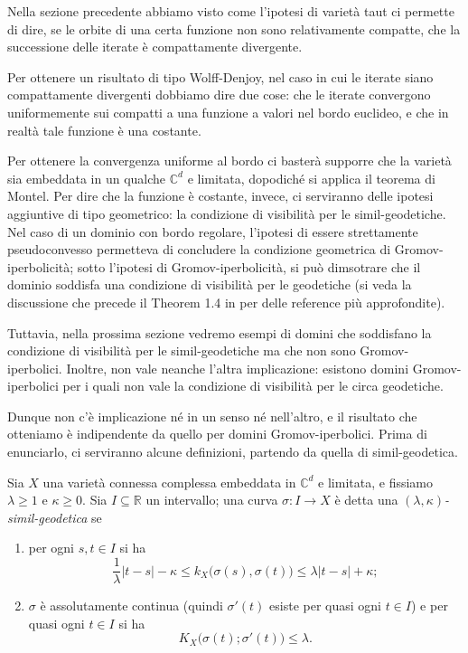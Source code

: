 Nella sezione precedente abbiamo visto come l'ipotesi di varietà taut ci permette di dire, se le orbite di una certa funzione non sono relativamente compatte, che la successione delle iterate è compattamente divergente.

Per ottenere un risultato di tipo Wolff-Denjoy, nel caso in cui le iterate siano compattamente divergenti dobbiamo dire due cose: che le iterate convergono uniformemente sui compatti a una funzione a valori nel bordo euclideo, e che in realtà tale funzione è una costante.

Per ottenere la convergenza uniforme al bordo ci basterà supporre che la varietà sia embeddata in un qualche $\mathbb{C}^d$ e limitata, dopodiché si applica il teorema di Montel. Per dire che la funzione è costante, invece, ci serviranno delle ipotesi aggiuntive di tipo geometrico: la condizione di visibilità per le simil-geodetiche. \\

Nel caso di un dominio con bordo regolare, l'ipotesi di essere strettamente pseudoconvesso permetteva di concludere la condizione geometrica di Gromov-iperbolicità; sotto l'ipotesi di Gromov-iperbolicità, si può dimsotrare che il dominio soddisfa una condizione di visibilità per le geodetiche (si veda la discussione che precede il Theorem 1.4 in \cite{BZ1} per delle reference più approfondite).

Tuttavia, nella prossima sezione vedremo esempi di domini che soddisfano la condizione di visibilità per le simil-geodetiche ma che non sono Gromov-iperbolici.
Inoltre, non vale neanche l'altra implicazione: esistono domini Gromov-iperbolici per i quali non vale la condizione di visibilità per le circa geodetiche.

Dunque non c'è implicazione né in un senso né nell'altro, e il risultato che otteniamo è indipendente da quello per domini Gromov-iperbolici. Prima di enunciarlo, ci serviranno alcune definizioni, partendo da quella di simil-geodetica.

\begin{defn}
    Sia $X$ una varietà connessa complessa embeddata in $\mathbb{C}^d$ e limitata, e fissiamo $\lambda \ge 1$ e $\kappa \ge 0$. Sia $I\subseteq \mathbb{R}$ un intervallo; una curva $\sigma:I \longrightarrow X$ è detta una \textit{$(\lambda,\kappa)$-simil-geodetica} se
    \begin{enumerate}
        \item per ogni $s,t \in I$ si ha
        $$\frac{1}{\lambda}|t-s|-\kappa \le k_X\big(\sigma(s),\sigma(t)\big)\le\lambda|t-s|+\kappa;$$
        \item $\sigma$ è assolutamente continua (quindi $\sigma'(t)$ esiste per quasi ogni $t \in I$) e per quasi ogni $t \in I$ si ha
        $$K_X\big(\sigma(t);\sigma'(t)\big) \le \lambda.$$
    \end{enumerate}
\end{defn}

